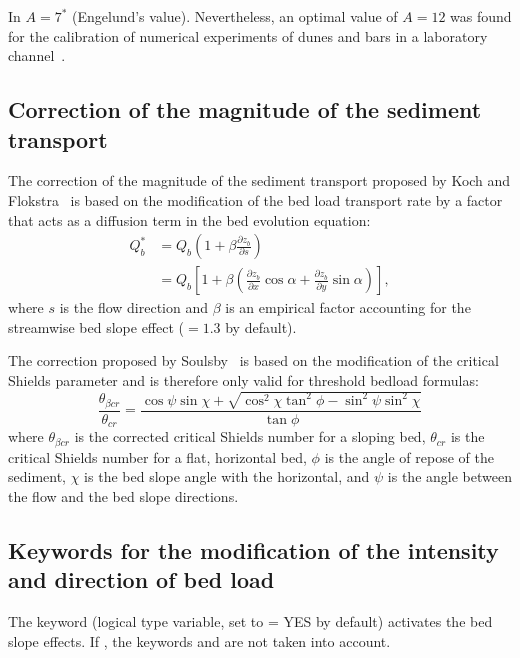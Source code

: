 In \gaia{} $A=7^*$ (Engelund's value). Nevertheless, an optimal value of $A=12$ was found for the calibration of numerical experiments of dunes and bars in a laboratory channel~\cite{Mendoza15}.

\subsection{Correction of the magnitude of the sediment transport}
The correction of the magnitude of the sediment transport proposed by Koch and Flokstra~\cite{KochFlokstra80} is based on the modification of the bed load transport rate by a factor that acts as a diffusion term in the bed evolution equation:
\begin{equation}
\begin{array}{ll} \displaystyle
Q_b^* &= Q_{b}\left(1+\beta\frac{\partial z_b}{\partial s}\right) \\
    &= Q_{b}\left[1 + \beta \left(\frac{\partial z_b}{\partial x} \cos\alpha + \frac{\partial z_b}{\partial y} \sin\alpha\right)\right],
\end{array}
\end{equation}
where $s$ is the flow direction and $\beta$ is an empirical factor accounting for the streamwise bed slope effect ($=1.3$ by default).

The correction proposed by Soulsby~\cite{Soulsby97} is based on the modification of the critical Shields parameter and is therefore only valid for threshold bedload formulas:
\begin{equation*}
\frac{\theta_{\beta cr}}{\theta_{cr}} = \frac{\cos\psi \sin\chi +
\sqrt{\cos^2\chi \tan^2\phi - \sin^2\psi \sin^2\chi}}{\tan
\phi}
\end{equation*}
where $\theta_{\beta cr}$ is the corrected critical Shields number for a sloping bed, $\theta_{cr}$ is the critical Shields number for a flat, horizontal bed, $\phi$ is the angle of repose of the sediment, $\chi$ is the bed slope angle with the horizontal, and $\psi$ is the angle between the flow and the bed slope directions.

\subsection{Keywords for the modification of the intensity and direction of bed load}
The keyword  (logical type variable, set to {\ttfamily = YES} by default) activates the bed slope effects. If , the keywords  and  are not taken into account.

